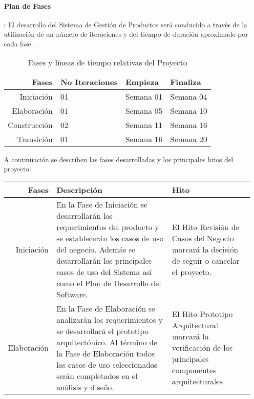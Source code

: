 \documentclass[a4paper,11pt, spanish]{report}
\begin{document}
{{{{{{{{            \paragraph{Plan de Fases}: El desarrollo del Sistema de Gestión de Productos será conducido a través de la utilización de un número de iteraciones y del tiempo de duración aproximado por cada fase. 
            {\renewcommand{\arraystretch}{1.7}%
            \noindent\begin{table}[H]
            \noindent\begin{tabularx}{\textwidth}{r|X|X|X}
            \textbf{{\large Fases}} & \textbf{{\large No Iteraciones}} & \textbf{{\large Empieza}} & \textbf{{\large Finaliza}} \\ \hline
            Iniciación & 01 & Semana 01 & Semana 04 \\ \hline
            Elaboración & 01 & Semana 05 & Semana 10 \\ \hline
            Construcción & 02 & Semana 11 & Semana 16 \\ \hline
            Transición & 01 & Semana 16 & Semana 20 \\ \hline
            \end{tabularx}
            \caption{Fases y líneas de tiempo relativas del Proyecto}
            \end {table}
                A continuación se describen las fases desarrolladas y los principales hitos del proyecto:
            {\renewcommand{\arraystretch}{1.5}%
            \noindent\begin{table}[H]
            \noindent\begin{tabularx}{\textwidth}{r|X|X}
            \textbf{{\large Fases}} & \textbf{{\large Descripción}} & \textbf{{\large Hito}} \\ \hline
            Iniciación & En la Fase de Iniciación se desarrollarán los requerimientos del producto y se establecerán los casos de uso del negocio. Además se desarrollarán los principales casos de uso del Sistema así como el Plan de Desarrollo del Software.  & El Hito Revisión de Casos del Negocio marcará la decisión de seguir o cancelar el proyecto.  \\ \hline
            Elaboración & En la Fase de Elaboración se analizarán los requerimientos y  se desarrollará el prototipo arquitectónico. Al término de la Fase de Elaboración todos los casos de uso seleccionados serán completados en el análisis y diseño.  & El Hito Prototipo Arquitectural marcará la verificación de los principales componentes arquitecturales \\ \hline

\end{tabularx}
\end{table}}}}}}}}}}}
\end{document}
